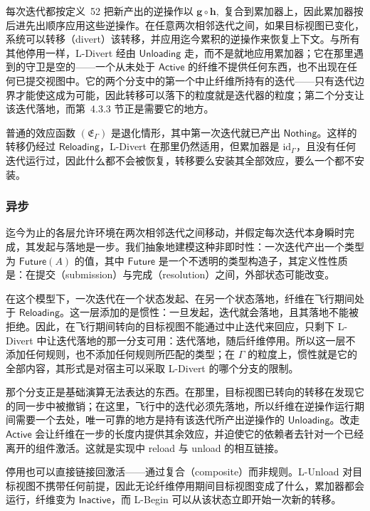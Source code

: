\documentclass[
  10
]{article}
\begin{document}
每次迭代都按定义~52 把新产出的逆操作以 \({ \boldsymbol { g } } \circ { \boldsymbol { h } } ,\) 复合到累加器上，因此累加器按后进先出顺序应用这些逆操作。在任意两次相邻迭代之间，如果目标视图已变化，系统可以转移（divert）该转移，并应用迄今累积的逆操作来恢复上下文。与所有其他停用一样，L-Divert 经由 \(\mathsf { U n l o a d i n g }\) 走，而不是就地应用累加器；它在那里遇到的守卫是空的——一个从未处于 \(\mathsf { A c t i v e }\) 的纤维不提供任何东西，也不出现在任何已提交视图中。它的两个分支中的第一个中止纤维所持有的迭代——只有迭代边界才能使这成为可能，因此转移可以落下的粒度就是迭代器的粒度；第二个分支让该迭代落地，而第~4.3.3 节正是需要它的地方。

普通的效应函数 \(( \mathfrak { E } _ { \Gamma } )\) 是退化情形，其中第一次迭代就已产出 \(\mathsf { N o t h i n g }\)。这样的转移仍经过 \(\mathsf { R e l o a d i n g }\)，L-Divert 在那里仍然适用，但累加器是 \(\mathrm { i d } _ { \Gamma }\)，且没有任何迭代运行过，因此什么都不会被恢复，转移要么安装其全部效应，要么一个都不安装。

\subsubsection{异步} \label{asynchrony}

迄今为止的各层允许环境在两次相邻迭代之间移动，并假定每次迭代本身瞬时完成，其发起与落地是一步。我们抽象地建模这种非即时性：一次迭代产出一个类型为 \(\mathsf { F u t u r e } ( A )\) 的值，其中 \(\mathsf { F u t u r e }\) 是一个不透明的类型构造子，其定义性性质是：在提交（submission）与完成（resolution）之间，外部状态可能改变。

在这个模型下，一次迭代在一个状态发起、在另一个状态落地，纤维在飞行期间处于 \(\mathsf { R e l o a d i n g }\)。这一层添加的是惯性：一旦发起，迭代就会落地，且其落地不能被拒绝。因此，在飞行期间转向的目标视图不能通过中止迭代来回应，只剩下 L-Divert 中让迭代落地的那一分支可用：迭代落地，随后纤维停用。所以这一层不添加任何规则，也不添加任何规则所匹配的类型；在 \(\Gamma\) 的粒度上，惯性就是它的全部内容，其形式是对宿主可以采取 L-Divert 的哪个分支的限制。

那个分支正是基础演算无法表达的东西。在那里，目标视图已转向的转移在发现它的同一步中被撤销；在这里，飞行中的迭代必须先落地，所以纤维在逆操作运行期间需要一个去处，唯一可靠的地方是持有该迭代所产出逆操作的 \(\mathsf { U n l o a d i n g }\)。改走 \(\mathsf { A c t i v e }\) 会让纤维在一步的长度内提供其余效应，并迫使它的依赖者去针对一个已经离开的组件激活。这就是实现中 reload 与 unload 的相互链接。

停用也可以直接链接回激活——通过复合（composite）而非规则。L-Unload 对目标视图不携带任何前提，因此无论纤维停用期间目标视图变成了什么，累加器都会运行，纤维变为 \(\mathsf { I n a c t i v e }\)，而 L-Begin 可以从该状态立即开始一次新的转移。
\end{document}
